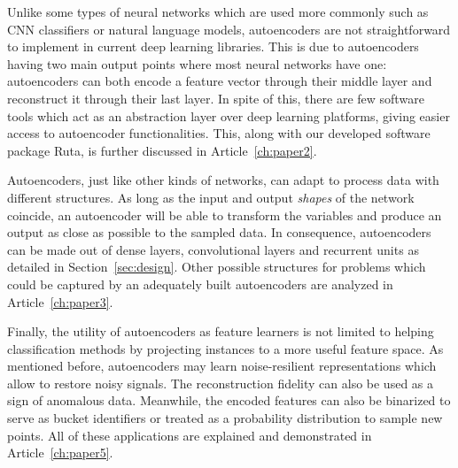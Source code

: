 Unlike some types of neural networks which are used more commonly such as CNN classifiers or natural language models, autoencoders are not straightforward to implement in current deep learning libraries. This is due to autoencoders having two main output points where most neural networks have one: autoencoders can both encode a feature vector through their middle layer and reconstruct it through their last layer. In spite of this, there are few software tools which act as an abstraction layer over deep learning platforms, giving easier access to autoencoder functionalities. This, along with our developed software package Ruta, is further discussed in Article~\ref{ch:paper2}.

Autoencoders, just like other kinds of networks, can adapt to process data with different structures. As long as the input and output \textit{shapes} of the network coincide, an autoencoder will be able to transform the variables and produce an output as close as possible to the sampled data. In consequence, autoencoders can be made out of dense layers, convolutional layers and recurrent units as detailed in Section~\ref{sec:design}. Other possible structures for problems which could be captured by an adequately built autoencoders are analyzed in Article~\ref{ch:paper3}.

Finally, the utility of autoencoders as feature learners is not limited to helping classification methods by projecting instances to a more useful feature space. As mentioned before, autoencoders may learn noise-resilient representations which allow to restore noisy signals. The reconstruction fidelity can also be used as a sign of anomalous data. Meanwhile, the encoded features can also be binarized to serve as bucket identifiers or treated as a probability distribution to sample new points. All of these applications are explained and demonstrated in Article~\ref{ch:paper5}.